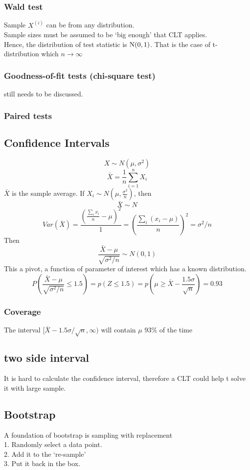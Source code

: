 \documentclass[12pt,a4paper]{article}
\begin{document}
\subsubsection*{Wald test}
Sample $X^{(i)}$ can be from any distribution.\\
Sample sizes must be assumed to be `big enough' that CLT applies.\\
Hence, the distribution of test statistic is $\rm N(0,1)$. That is the case of t-distribution which $n \rightarrow \infty$
\subsubsection*{Goodness-of-fit tests (chi-square test)}
still needs to be discussed.
\subsubsection*{Paired tests}
\subsection*{Confidence Intervals}
$$
X \sim N(\mu,\sigma^2)
$$
$$
\bar X = \frac{1}{n}\sum_{i=1}^{n}X_i
$$
$\bar X$ is the sample average. If $X_i \sim N(\mu,\frac{\sigma^2}{n})$, then
$$
\bar X \sim N
$$
$$
Var(\bar X) = \frac{(\frac{\sum_ix_i}{n}-\mu)^2}{1}=(\frac{\sum_i(x_i-\mu)}{n})^2=\sigma^2/n 
$$Then
$$
\frac{\bar X-\mu}{\sqrt{\sigma^2/n}} \sim N(0,1)
$$
This a pivot, a function of parameter of interest which has a known distribution.\\
$$
P\left(\frac{\bar X-\mu}{\sqrt{\sigma^2/n}}\le 1.5\right) = p(Z\le 1.5)=p\left(\mu\ge \bar X-\frac{1.5\sigma}{\sqrt n}\right) = 0.93
$$
\subsubsection*{Coverage}
The interval $[\bar X-1.5\sigma/\sqrt n,\infty)$ will contain $\mu$ 93\% of the time
\subsection*{two side interval}
It is hard to calculate the confidence interval, therefore a CLT could help t solve it with large sample.
\subsection*{Bootstrap}
A foundation of bootstrap is sampling with replacement\\
1. Randomly select a data point.\\
2. Add it to the `re-sample'\\
3. Put it back in the box.\\
\end{document}
